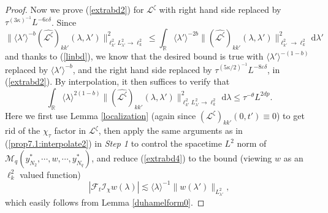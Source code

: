 \documentclass[11 pt,reqno]{amsart}
\theoremstyle{definition}
\theoremstyle{remark}
\numberwithin{equation}{section}
\newcommand{\Ic}{\mathcal{I}}
\newcommand{\Fc}{\mathcal{F}}
\renewcommand{\Mc}{\mathcal{M}}
\newcommand{\Rb}{\mathbb{R}}
\newcommand{\Ls}{\mathscr{L}}
\begin{document}
{\begin{proof}
Now we prove (\ref{extrabd2}) for $\Ls^{\zeta}$ with right hand side replaced by $\tau^{(3\kappa)^{-1}}L^{-6\varepsilon\delta}$. Since
\[\|\langle\lambda'\rangle^{-b}(\widehat{\Ls^\zeta})_{kk'}(\lambda,\lambda')\|_{\ell_{k'}^2L_{\lambda'}^2\to \ell_k^2}^2\leq\int_\Rb\langle\lambda'\rangle^{-2b}\|(\widehat{\Ls^\zeta})_{kk'}(\lambda,\lambda')\|_{\ell_{k'}^2\to \ell_k^2}^2\,\mathrm{d}\lambda'\] and thanks to (\ref{linbd}), we know that the desired bound is true with $\langle\lambda'\rangle^{-(1-b)}$ replaced by $\langle\lambda'\rangle^{-b}$, and the right hand side replaced by $\tau^{(5\kappa/2)^{-1}}L^{-8\varepsilon\delta}$, in (\ref{extrabd2}). By interpolation, it then suffices to verify that
\begin{equation}\label{extrabd4}\int_\Rb\langle \lambda\rangle^{2(1-b)}\|(\widehat{\Ls^\zeta})_{kk'}(\lambda,\lambda')\|_{\ell_{k'}^2L_{\lambda'}^2\to \ell_k^2}^2\,\mathrm{d}\lambda\leq\tau^{-\theta}L^{2dp}.
\end{equation} Here we first use Lemma \ref{localization} (again since $(\Ls^\zeta)_{kk'}(0,t')\equiv 0$) to get rid of the $\chi_\tau$ factor in $\Ls^{\zeta}$, then apply the same arguments as in (\ref{prop7.1:interpolate2}) in \emph{Step 1} to control the spacetime $L^2$ norm of $\Mc_q(y_{N_2}^*,\cdots,w,\cdots,y_{N_{q}}^*)$, and reduce (\ref{extrabd4}) to the bound (viewing $w$ as an $\ell_k^2$ valued function)
\[|\Fc_t\Ic_\chi w(\lambda)|\lesssim\langle\lambda\rangle^{-1}\|w(\lambda')\|_{L_{\lambda'}^2},\] which easily follows from Lemma \ref{duhamelform0}.


\end{proof}}
\end{document}
